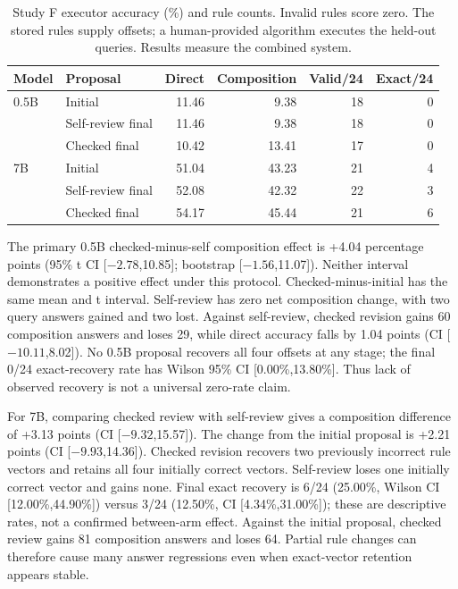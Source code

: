 \documentclass[11pt]{article}
\begin{document}
\begin{table}[htbp]
\centering\small
\begin{tabular}{llrrrr}
\toprule
Model & Proposal & Direct & Composition & Valid/24 & Exact/24 \\
\midrule
0.5B & Initial & 11.46 & 9.38 & 18 & 0 \\
& Self-review final & 11.46 & 9.38 & 18 & 0 \\
& Checked final & 10.42 & 13.41 & 17 & 0 \\
7B & Initial & 51.04 & 43.23 & 21 & 4 \\
& Self-review final & 52.08 & 42.32 & 22 & 3 \\
& Checked final & 54.17 & 45.44 & 21 & 6 \\
\bottomrule
\end{tabular}
\caption{Study F executor accuracy (\%) and rule counts. Invalid rules score
zero. The stored rules supply offsets; a human-provided algorithm executes
the held-out queries. Results measure the combined system.}
\label{tab:f}
\end{table}

The primary 0.5B checked-minus-self composition effect is +4.04 percentage
points (95\% t CI [$-2.78$,10.85]; bootstrap [$-1.56$,11.07]). Neither interval
demonstrates a positive effect under this protocol. Checked-minus-initial has
the same mean and t interval. Self-review has zero net composition change,
with two query answers gained and two lost. Against self-review, checked
revision gains 60 composition answers and loses 29, while direct accuracy
falls by 1.04 points (CI [$-10.11$,8.02]). No 0.5B proposal recovers all four
offsets at any stage; the final 0/24 exact-recovery rate has Wilson 95\% CI
[0.00\%,13.80\%]. Thus lack of observed recovery is not a universal zero-rate
claim.

For 7B, comparing checked review with self-review gives a composition difference
of +3.13 points (CI [$-9.32$,15.57]). The change from the initial proposal is
+2.21 points (CI [$-9.93$,14.36]). Checked revision recovers two previously incorrect rule
vectors and retains all four initially correct vectors. Self-review loses one
initially correct vector and gains none. Final exact recovery is 6/24
(25.00\%, Wilson CI [12.00\%,44.90\%]) versus 3/24
(12.50\%, CI [4.34\%,31.00\%]); these are descriptive rates, not a confirmed
between-arm effect. Against the initial proposal, checked review gains 81
composition answers and loses 64. Partial rule changes can therefore cause
many answer regressions even when exact-vector retention appears stable.
\end{document}
